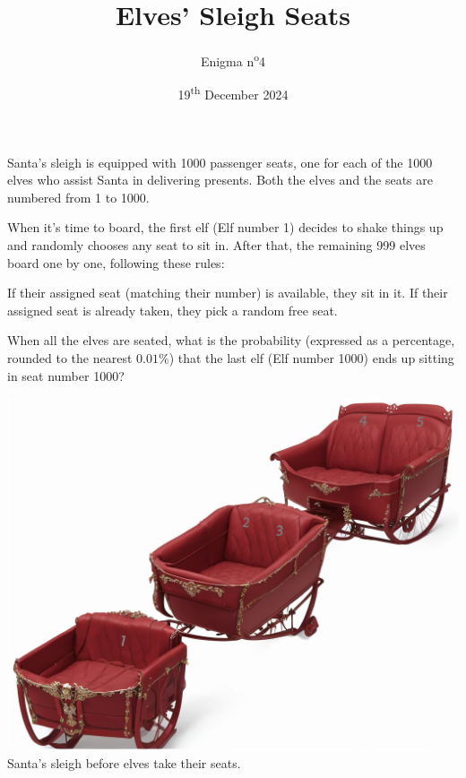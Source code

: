 \documentclass[a4paper, top=10mm]{article}
\title{\textbf{\huge{Elves' Sleigh Seats}}}
\author{Enigma n\textsuperscript{o}4}
\date{19\textsuperscript{th} December 2024}
\begin{document}
	\maketitle
	
	Santa’s sleigh is equipped with 1000 passenger seats, one for each of the 1000 elves who assist Santa in delivering presents. Both the elves and the seats are numbered from 1 to 1000.
	
	When it’s time to board, the first elf (Elf number 1) decides to shake things up and randomly chooses any seat to sit in. After that, the remaining 999 elves board one by one, following these rules:
	
	If their assigned seat (matching their number) is available, they sit in it.
	If their assigned seat is already taken, they pick a random free seat.
	
	When all the elves are seated, what is the probability (expressed as a percentage, rounded to the nearest $0.01\%$) that the last elf (Elf number 1000) ends up sitting in seat number 1000?
	
	\begin{center}
		\includegraphics[width=\linewidth]{04sleigh_seats.png}
		Santa's sleigh before elves take their seats.
		
	\end{center}
	
	
\end{document}
